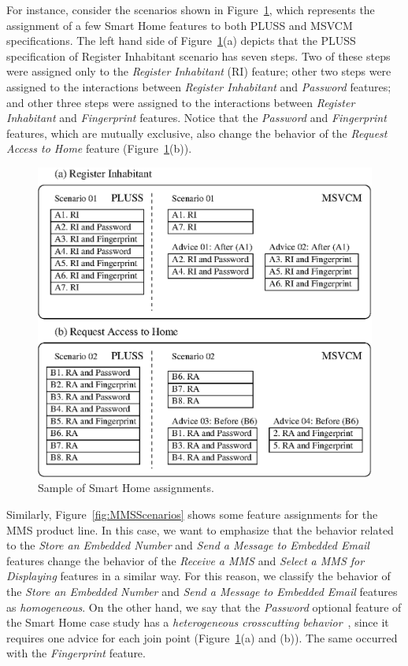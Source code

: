 For instance, consider the scenarios shown in
Figure~\ref{fig:smartHomeScenarios}, which represents the assignment of a few Smart Home features to 
both PLUSS and MSVCM specifications. The left hand side of
Figure~\ref{fig:smartHomeScenarios}(a) depicts that the PLUSS specification of
Register Inhabitant scenario has seven steps. Two of these steps were assigned only to the \emph{Register Inhabitant} (RI) feature; other two steps
were assigned to the interactions between \emph{Register Inhabitant} and
\emph{Password} features; and other three steps were assigned to the
interactions between \emph{Register Inhabitant} and \emph{Fingerprint}
features. Notice that the \emph{Password} and \emph{Fingerprint} features, which
are mutually exclusive, also change the behavior of the \emph{Request Access to
Home} feature (Figure~\ref{fig:smartHomeScenarios}(b)).


\begin{figure}[th]
 \begin{center}
  \includegraphics[scale=0.62]{img/comparisonScenarios.eps}
  \caption{Sample of Smart Home assignments.}
  \label{fig:smartHomeScenarios}
  \end{center}
\end{figure}

Similarly, Figure~\ref{fig:MMSScenarios} shows some feature assignments for the
MMS product line. In this case, we want to emphasize that the behavior related to
the \emph{Store an Embedded Number} and \emph{Send a Message to Embedded Email} 
features change the behavior of the \emph{Receive a MMS} and \emph{Select a
MMS for Displaying} features in a similar way. For this reason, we
classify the behavior of the \emph{Store an Embedded Number} and \emph{Send
a Message to Embedded Email} features as \emph{homogeneous}. On the other hand,
we say that the \emph{Password} optional feature of the Smart Home case study has a
\emph{heterogeneous crosscutting behavior}~\cite{Apel:2006aa}, since it requires one advice for each join point (Figure~\ref{fig:smartHomeScenarios}(a) and (b)). The same occurred with the \emph{Fingerprint} feature.

